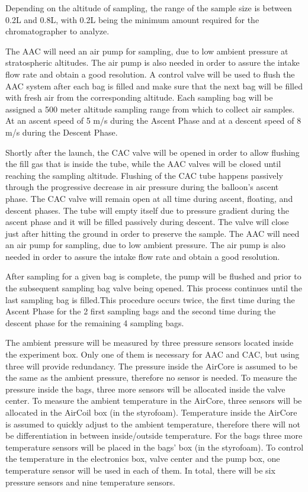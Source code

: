 Depending on the altitude of sampling, the range of the sample size is between 0.2L and 0.8L, with 0.2L being the minimum amount required for the chromatographer to analyze. 

The AAC will need an air pump for sampling, due to low ambient pressure at stratospheric altitudes. The air pump is also needed in order to assure the intake flow rate and obtain a good resolution. A control valve will be used to flush the AAC system after each bag is filled and make sure that the next bag will be filled with fresh air from the corresponding altitude. Each sampling bag will be assigned a 500 meter altitude sampling range from which to collect air samples. At an ascent speed of 5 m/s during the Ascent Phase and at a descent speed of 8 m/s during the Descent Phase. 

Shortly after the launch, the CAC valve will be opened in order to allow flushing the fill gas that is inside the tube, while the AAC valves will be closed until reaching the sampling altitude. Flushing of the CAC tube happens passively through the progressive decrease in air pressure during the balloon's ascent phase. The CAC valve will remain open at all time during ascent, floating, and descent phases. The tube will empty itself due to pressure gradient during the ascent phase and it will be filled passively during descent. The valve will close just after hitting the ground in order to preserve the sample. The AAC will need an air pump for sampling, due to low ambient pressure. The air pump is also needed in order to assure the intake flow rate and obtain a good resolution.

After sampling for a given bag is complete, the pump will be flushed and prior to the subsequent sampling bag valve being opened. This process continues until the last sampling bag is filled.This procedure occurs twice, the first time during the Ascent Phase for the 2 first sampling bags and the second time during the descent phase for the remaining 4 sampling bags.

The ambient pressure will be measured by three pressure sensors located inside the experiment box. Only one of them is necessary for AAC and CAC, but using three will provide redundancy. The pressure inside the AirCore is assumed to be the same as the ambient pressure, therefore no sensor is needed. To measure the pressure inside the bags, three more sensors will be allocated inside the valve center. To measure the ambient temperature in the AirCore, three sensors will be allocated in the AirCoil box (in the styrofoam). Temperature inside the AirCore is assumed to quickly adjust to the ambient temperature, therefore there will not be differentiation in between inside/outside temperature. For the bags three more temperature sensors will be placed in the bags' box (in the styrofoam). To control the temperature in the electronics box, valve center and the pump box, one temperature sensor will be used in each of them. In total, there will be six pressure sensors and nine temperature sensors. 


